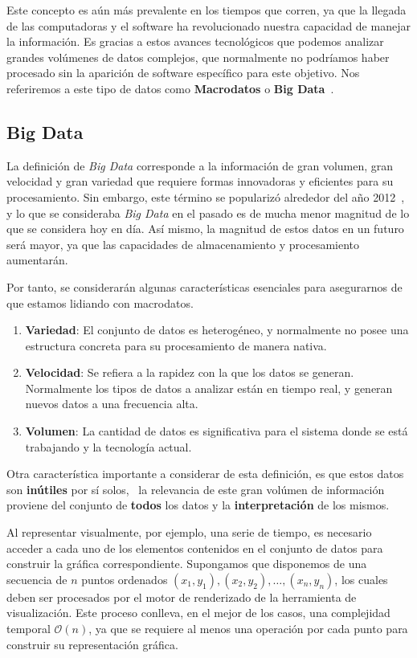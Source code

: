 Este concepto es aún más prevalente en los tiempos que corren, ya que la llegada de las computadoras y el software ha revolucionado nuestra capacidad de manejar la información. Es gracias a estos avances tecnológicos que podemos analizar grandes volúmenes de datos complejos, que normalmente no podríamos haber procesado sin la aparición de software específico para este objetivo. Nos referiremos a este tipo de datos como \textbf{Macrodatos} o \textbf{Big Data}~\cite{mcafee2012bigdata}.


\subsection{Big Data}

La definición de \textit{Big Data} corresponde a la información de gran volumen, gran velocidad y gran variedad que requiere formas innovadoras y eficientes para su procesamiento. Sin embargo, este término se popularizó alrededor del año 2012~\cite{diebold2012bigdata}, y lo que se consideraba \textit{Big Data} en el pasado es de mucha menor magnitud de lo que se considera hoy en día. Así mismo, la magnitud de estos datos en un futuro será mayor, ya que las capacidades de almacenamiento y procesamiento aumentarán.

Por tanto, se considerarán algunas características esenciales para asegurarnos de que estamos lidiando con macrodatos.
\begin{enumerate}
    \item \textbf{Variedad}:         El conjunto de datos es heterogéneo, y normalmente no posee una estructura concreta para su procesamiento de manera nativa.
    \item \textbf{Velocidad}: 
        Se refiera a la rapidez con la que los datos se generan. Normalmente los tipos de datos a analizar están en tiempo real, y generan nuevos datos a una frecuencia alta.
    \item \textbf{Volumen}: 
        La cantidad de datos es significativa para el sistema donde se está trabajando y la tecnología actual.
\end{enumerate}

Otra característica importante a considerar de esta definición, es que estos datos son \textbf{inútiles} por sí solos,~\cite{gandomi2015beyond} la relevancia de este gran volúmen de información proviene del conjunto de \textbf{todos} los datos y la \textbf{interpretación} de los mismos. 

Al representar visualmente, por ejemplo, una serie de tiempo, es necesario acceder a cada uno de los elementos contenidos en el conjunto de datos para construir la gráfica correspondiente. Supongamos que disponemos de una secuencia de \( n \) puntos ordenados \((x_1, y_1), (x_2, y_2), \ldots, (x_n, y_n)\), los cuales deben ser procesados por el motor de renderizado de la herramienta de visualización. Este proceso conlleva, en el mejor de los casos, una complejidad temporal \(\mathcal{O}(n)\), ya que se requiere al menos una operación por cada punto para construir su representación gráfica.

